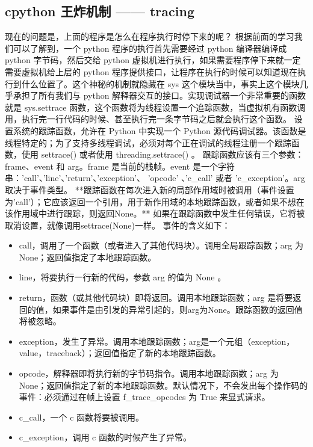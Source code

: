 \subsection{cpython 王炸机制 —— tracing}
现在的问题是，上面的程序是怎么在程序执行时停下来的呢？
根据前面的学习我们可以了解到，一个 python 程序的执行首先需要经过 python 编译器编译成 python 字节码，然后交给 python 虚拟机进行执行，如果需要程序停下来就一定需要虚拟机给上层的 python 程序提供接口，让程序在执行的时候可以知道现在执行到什么位置了。这个神秘的机制就隐藏在 sys 这个模块当中，事实上这个模块几乎承担了所有我们与 python 解释器交互的接口。实现调试器一个非常重要的函数就是 sys.settrace 函数，这个函数将为线程设置一个追踪函数，当虚拟机有函数调用，执行完一行代码的时候、甚至执行完一条字节码之后就会执行这个函数。
设置系统的跟踪函数，允许在 Python 中实现一个 Python 源代码调试器。该函数是线程特定的；为了支持多线程调试，必须对每个正在调试的线程注册一个跟踪函数，使用 settrace() 或者使用 threading.settrace() 。
跟踪函数应该有三个参数：frame、event 和 arg。frame 是当前的栈帧。event 是一个字符串：'call'、'line'、'return'、'exception'、 'opcode' 、'c\_call' 或者  'c\_exception'。arg 取决于事件类型。
**跟踪函数在每次进入新的局部作用域时被调用（事件设置为'call'）；它应该返回一个引用，用于新作用域的本地跟踪函数，或者如果不想在该作用域中进行跟踪，则返回None。**
如果在跟踪函数中发生任何错误，它将被取消设置，就像调用settrace(None)一样。
事件的含义如下：
\begin{itemize}
\item call，调用了一个函数（或者进入了其他代码块）。调用全局跟踪函数；arg 为 None；返回值指定了本地跟踪函数。 
\item line，将要执行一行新的代码，参数 arg 的值为 None 。 
\item return，函数（或其他代码块）即将返回。调用本地跟踪函数；arg 是将要返回的值，如果事件是由引发的异常引起的，则arg为None。跟踪函数的返回值将被忽略。 
\item exception，发生了异常。调用本地跟踪函数；arg是一个元组（exception，value，traceback）；返回值指定了新的本地跟踪函数。 
\item opcode，解释器即将执行新的字节码指令。调用本地跟踪函数；arg 为 None；返回值指定了新的本地跟踪函数。默认情况下，不会发出每个操作码的事件：必须通过在帧上设置 f\_trace\_opcodes 为 True 来显式请求。 
\item c\_call，一个 c 函数将要被调用。 
\item c\_exception，调用 c 函数的时候产生了异常。 
\end{itemize}
